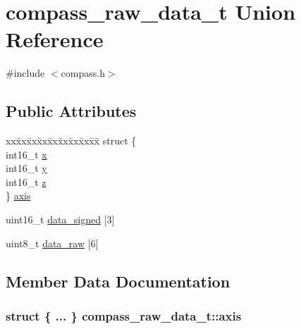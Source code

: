 \hypertarget{unioncompass__raw__data__t}{}\section{compass\+\_\+raw\+\_\+data\+\_\+t Union Reference}
\label{unioncompass__raw__data__t}


{\ttfamily \#include $<$compass.\+h$>$}

\subsection*{Public Attributes}
\begin{DoxyCompactItemize}
\item 
\begin{tabbing}
xx\=xx\=xx\=xx\=xx\=xx\=xx\=xx\=xx\=\kill
struct \{\\
\>int16\_t \hyperlink{unioncompass__raw__data__t_a7e67aed6783296387dca0fada37da808}{x}\\
\>int16\_t \hyperlink{unioncompass__raw__data__t_a46f264b0e9a1b28784f45c7b8aabc456}{y}\\
\>int16\_t \hyperlink{unioncompass__raw__data__t_a17996b57c24f32c439ec4ef9b1ab6e69}{z}\\
\} \hyperlink{unioncompass__raw__data__t_a45e92ddf59d05367dcc6dd4e7252636f}{axis}\\

\end{tabbing}\item 
uint16\+\_\+t \hyperlink{unioncompass__raw__data__t_ae37bda8d4edc5d2e648885c919e078a0}{data\+\_\+signed} \mbox{[}3\mbox{]}
\item 
uint8\+\_\+t \hyperlink{unioncompass__raw__data__t_a2db6fcdbb55cdc519f8d585c2736c9ba}{data\+\_\+raw} \mbox{[}6\mbox{]}
\end{DoxyCompactItemize}


\subsection{Member Data Documentation}
\subsubsection[{\texorpdfstring{axis}{axis}}]{\setlength{\rightskip}{0pt plus 5cm}struct \{ ... \}   compass\+\_\+raw\+\_\+data\+\_\+t\+::axis}\hypertarget{unioncompass__raw__data__t_a45e92ddf59d05367dcc6dd4e7252636f}{}\label{unioncompass__raw__data__t_a45e92ddf59d05367dcc6dd4e7252636f}
